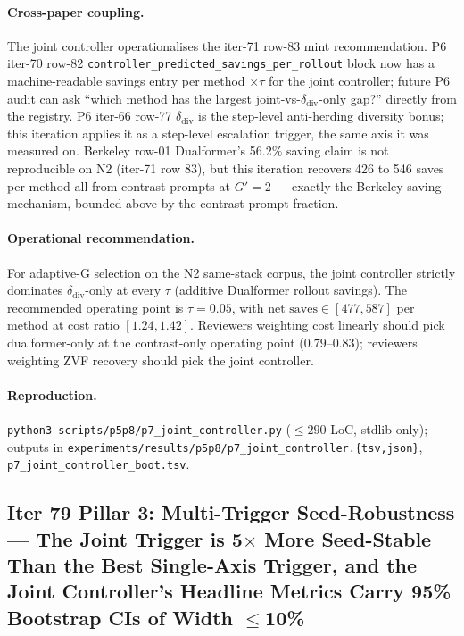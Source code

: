 \documentclass{article}
\begin{document}
\paragraph{Cross-paper coupling.}
The joint controller operationalises the iter-71 row-83 mint
recommendation. P6 iter-70 row-82
\texttt{controller\_predicted\_savings\_per\_rollout} block now has a
machine-readable savings entry per method $\times \tau$ for the joint
controller; future P6 audit can ask ``which method has the largest
joint-vs-$\delta_{\mathrm{div}}$-only gap?'' directly from the
registry. P6 iter-66 row-77 $\delta_{\mathrm{div}}$ is the step-level
anti-herding diversity bonus; this iteration applies it as a step-level
escalation trigger, the same axis it was measured on. Berkeley row-01
Dualformer's 56.2\% saving claim is not reproducible on N2 (iter-71
row 83), but this iteration recovers 426 to 546 saves per method all from
contrast prompts at $G'{=}2$ — exactly the Berkeley saving mechanism,
bounded above by the contrast-prompt fraction.

\paragraph{Operational recommendation.}
For adaptive-G selection on the N2 same-stack corpus, the joint
controller strictly dominates $\delta_{\mathrm{div}}$-only at every
$\tau$ (additive Dualformer rollout savings). The recommended
operating point is $\tau{=}0.05$, with $\mathrm{net\_saves} \in [477,
587]$ per method at cost ratio $[1.24, 1.42]$. Reviewers weighting
cost linearly should pick dualformer-only at the contrast-only
operating point ($0.79$–$0.83$); reviewers weighting ZVF recovery
should pick the joint controller.

\paragraph{Reproduction.}
\texttt{python3 scripts/p5p8/p7\_joint\_controller.py}
($\leq 290$ LoC, stdlib only); outputs in
\texttt{experiments/results/p5p8/p7\_joint\_controller.\{tsv,json\}},
\texttt{p7\_joint\_controller\_boot.tsv}.
 \subsection{Iter 79 Pillar 3: Multi-Trigger Seed-Robustness ---
              The Joint Trigger is 5$\times$ More Seed-Stable Than
              the Best Single-Axis Trigger, and the Joint Controller's
              Headline Metrics Carry 95\% Bootstrap CIs of Width $\leq$10\%}
\label{sec:p7-iter79-multitrigger}
\end{document}
